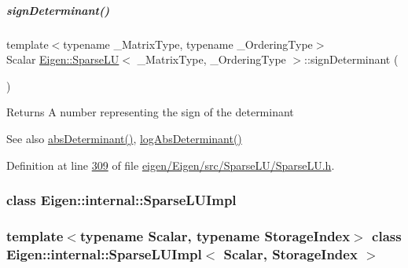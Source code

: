\mbox{\label{group___sparse_l_u___module_a6651143e3b18fa90cfb3808b6fd23c4e}} 
\subparagraph{\texorpdfstring{sign\+Determinant()}{signDeterminant()}\hspace{0.1cm}{\footnotesize\ttfamily [2/2]}}
{\footnotesize\ttfamily template$<$typename \+\_\+\+Matrix\+Type, typename \+\_\+\+Ordering\+Type$>$ \\
Scalar \hyperlink{group___sparse_l_u___module_class_eigen_1_1_sparse_l_u}{Eigen\+::\+Sparse\+LU}$<$ \+\_\+\+Matrix\+Type, \+\_\+\+Ordering\+Type $>$\+::sign\+Determinant (\begin{DoxyParamCaption}{ }\end{DoxyParamCaption})\hspace{0.3cm}{\ttfamily [inline]}}

\begin{DoxyReturn}{Returns}
A number representing the sign of the determinant
\end{DoxyReturn}
\begin{DoxySeeAlso}{See also}
\hyperlink{group___sparse_l_u___module_a06fa89424239fb169d408f08252426d0}{abs\+Determinant()}, \hyperlink{group___sparse_l_u___module_a89e30a7df205596784a5a73f4768eaec}{log\+Abs\+Determinant()} 
\end{DoxySeeAlso}


Definition at line \hyperlink{eigen_2_eigen_2src_2_sparse_l_u_2_sparse_l_u_8h_source_l00309}{309} of file \hyperlink{eigen_2_eigen_2src_2_sparse_l_u_2_sparse_l_u_8h_source}{eigen/\+Eigen/src/\+Sparse\+L\+U/\+Sparse\+L\+U.\+h}.

\label{class_eigen_1_1internal_1_1_sparse_l_u_impl}
\subsubsection{class Eigen\+:\+:internal\+:\+:Sparse\+L\+U\+Impl}
\subsubsection*{template$<$typename Scalar, typename Storage\+Index$>$\newline
class Eigen\+::internal\+::\+Sparse\+L\+U\+Impl$<$ Scalar, Storage\+Index $>$}

